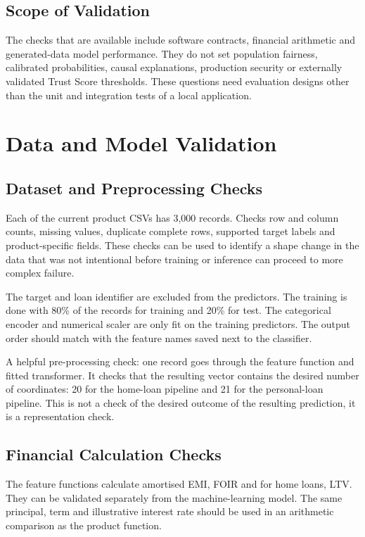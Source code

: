 \subsection{Scope of Validation}
The checks that are available include software contracts, financial arithmetic and generated-data model performance. They do not set population fairness, calibrated probabilities, causal explanations, production security or externally validated Trust Score thresholds. These questions need evaluation designs other than the unit and integration tests of a local application.

\section{Data and Model Validation}
\subsection{Dataset and Preprocessing Checks}
Each of the current product CSVs has 3,000 records. Checks row and column counts, missing values, duplicate complete rows, supported target labels and product-specific fields. These checks can be used to identify a shape change in the data that was not intentional before training or inference can proceed to more complex failure.

The target and loan identifier are excluded from the predictors. The training is done with 80\% of the records for training and 20\% for test. The categorical encoder and numerical scaler are only fit on the training predictors. The output order should match with the feature names saved next to the classifier.

A helpful pre-processing check: one record goes through the feature function and fitted transformer. It checks that the resulting vector contains the desired number of coordinates: 20 for the home-loan pipeline and 21 for the personal-loan pipeline. This is not a check of the desired outcome of the resulting prediction, it is a representation check.

\subsection{Financial Calculation Checks}
The feature functions calculate amortised EMI, FOIR and for home loans, LTV. They can be validated separately from the machine-learning model. The same principal, term and illustrative interest rate should be used in an arithmetic comparison as the product function.

